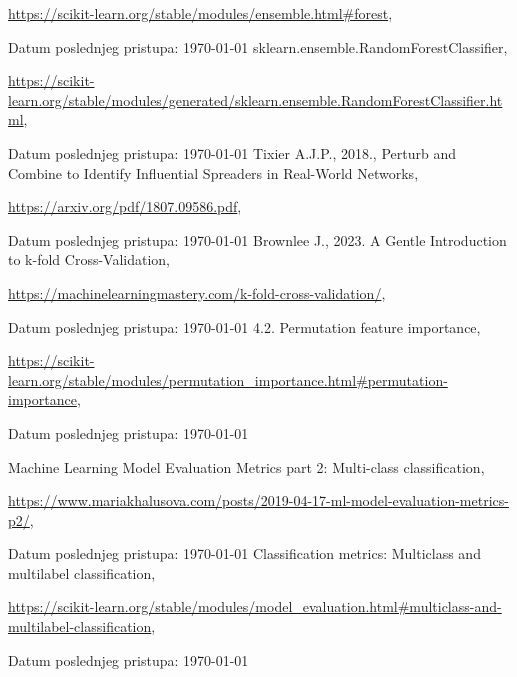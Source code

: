 \documentclass[fontsize=12bp, paper=a4]{scrarticle}
\begin{document}
\begin{thebibliography}{1}
    \url{https://scikit-learn.org/stable/modules/ensemble.html#forest}, 
    
    Datum poslednjeg pristupa: \today
    sklearn.ensemble.RandomForestClassifier, 
    
    \url{https://scikit-learn.org/stable/modules/generated/sklearn.ensemble.RandomForestClassifier.html}, 
    
    Datum poslednjeg pristupa: \today
    Tixier A.J.P., 2018., Perturb and Combine to Identify Influential
Spreaders in Real-World Networks, 

    \url{https://arxiv.org/pdf/1807.09586.pdf}, 
    
    Datum poslednjeg pristupa: \today
   Brownlee J., 2023. A Gentle Introduction to k-fold Cross-Validation, 
   
   \url{https://machinelearningmastery.com/k-fold-cross-validation/}, 
   
   Datum poslednjeg pristupa: \today
   4.2. Permutation feature importance, 
   
   \url{https://scikit-learn.org/stable/modules/permutation_importance.html#permutation-importance}, 
   
   Datum poslednjeg pristupa: \today

    Machine Learning Model Evaluation Metrics part 2: Multi-class classification, 
    
    \url{https://www.mariakhalusova.com/posts/2019-04-17-ml-model-evaluation-metrics-p2/}, 
    
    Datum poslednjeg pristupa: \today
    Classification metrics: Multiclass and multilabel classification, 
    
    \url{https://scikit-learn.org/stable/modules/model_evaluation.html#multiclass-and-multilabel-classification}, 
    
    Datum poslednjeg pristupa: \today
\end{thebibliography}
\end{document}
